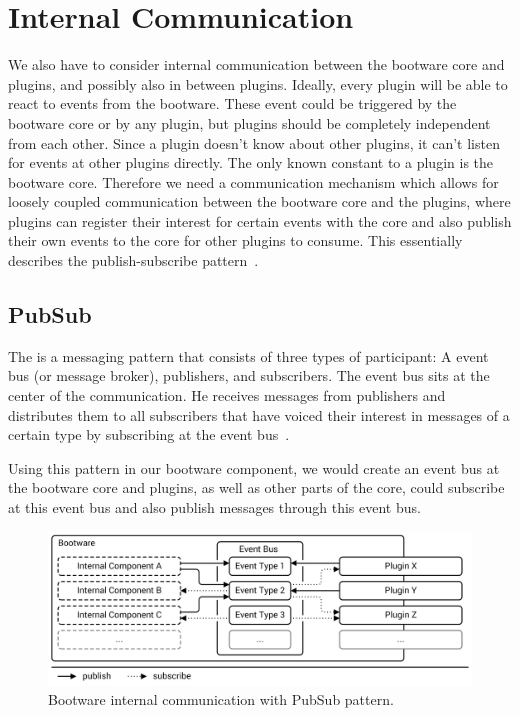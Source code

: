 \section{Internal Communication}
\label{design:internalcomm}

We also have to consider internal communication between the bootware core and plugins, and possibly also in between plugins.
Ideally, every plugin will be able to react to events from the bootware.
These event could be triggered by the bootware core or by any plugin, but plugins should be completely independent from each other.
Since a plugin doesn't know about other plugins, it can't listen for events at other plugins directly.
The only known constant to a plugin is the bootware core.
Therefore we need a communication mechanism which allows for loosely coupled communication between the bootware core and the plugins, where plugins can register their interest for certain events with the core and also publish their own events to the core for other plugins to consume.
This essentially describes the publish-subscribe pattern~\autocite{pubsub}.

\subsection{PubSub}

The  is a messaging pattern that consists of three types of participant: A event bus (or message broker), publishers, and subscribers.
The event bus sits at the center of the communication.
He receives messages from publishers and distributes them to all subscribers that have voiced their interest in messages of a certain type by subscribing at the event bus~\autocite{pubsub}.

Using this pattern in our bootware component, we would create an event bus at the bootware core and plugins, as well as other parts of the core, could subscribe at this event bus and also publish messages through this event bus.

\begin{figure}[!htbp]
	\centering
	\includegraphics[resolution=600]{design/assets/pubsub}
	\caption{Bootware internal communication with PubSub pattern.}
	\label{image:pubsub}
\end{figure}

